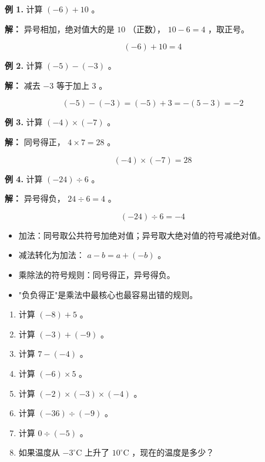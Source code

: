 \begin{workedexamples}


\textbf{例 1.} 计算 $(-6) + 10$ 。

\textbf{解：} 异号相加，绝对值大的是 $10$ （正数）， $10 - 6 = 4$ ，取正号。

\[
(-6) + 10 = 4
\]


\textbf{例 2.} 计算 $(-5) - (-3)$ 。

\textbf{解：} 减去 $-3$ 等于加上 $3$ 。

\[
(-5) - (-3) = (-5) + 3 = -(5 - 3) = -2
\]


\textbf{例 3.} 计算 $(-4) \times (-7)$ 。

\textbf{解：} 同号得正， $4 \times 7 = 28$ 。

\[
(-4) \times (-7) = 28
\]


\textbf{例 4.} 计算 $(-24) \div 6$ 。

\textbf{解：} 异号得负， $24 \div 6 = 4$ 。

\[
(-24) \div 6 = -4
\]


\end{workedexamples}

\begin{keytakeaway}


\begin{itemize}
  \item 加法：同号取公共符号加绝对值；异号取大绝对值的符号减绝对值。
  \item 减法转化为加法： $a - b = a + (-b)$ 。
  \item 乘除法的符号规则：同号得正，异号得负。
  \item "负负得正"是乘法中最核心也最容易出错的规则。
\end{itemize}


\end{keytakeaway}

\begin{practice}


\begin{enumerate}
  \item 计算 $(-8) + 5$ 。
  \item 计算 $(-3) + (-9)$ 。
  \item 计算 $7 - (-4)$ 。
  \item 计算 $(-6) \times 5$ 。
  \item 计算 $(-2) \times (-3) \times (-4)$ 。
  \item 计算 $(-36) \div (-9)$ 。
  \item 计算 $0 \div (-5)$ 。
  \item 如果温度从 $-3^\circ\text{C}$ 上升了 $10^\circ\text{C}$ ，现在的温度是多少？
\end{enumerate}


\end{practice}

